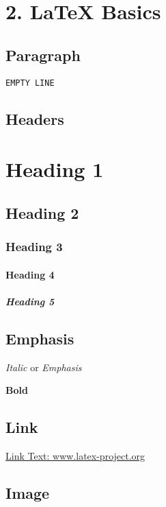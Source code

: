 \section{2. LaTeX Basics}

\subsection{Paragraph}

\texttt{EMPTY\ LINE}

\subsection{Headers}

\section{Heading 1}

\subsection{Heading 2}

\subsubsection{Heading 3}

\paragraph{Heading 4}

\subparagraph{Heading 5}

\subsection{Emphasis}

\textit{Italic} or \emph{Emphasis}

\textbf{Bold}

\subsection{Link}

\href{https://www.latex-project.org}{Link Text: www.latex-project.org}

\subsection{Image}

